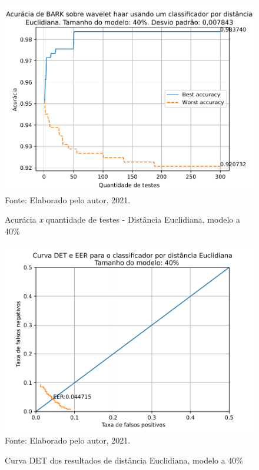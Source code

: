 			\begin{figure}[H]
				\centering
				\caption{Acurácia \textit{x} quantidade de testes - Distância Euclidiana, modelo a 40\%}
				\includegraphics[width=.9\linewidth]{images/results/confusionMatrices/classifier_Euclidian_40}
				\label{fig:classifiereuclidian40}
				\\Fonte: Elaborado pelo autor, 2021.
			\end{figure}
		
			\begin{figure}[H]
				\centering
				\caption{Curva DET dos resultados de distância Euclidiana, modelo a 40\%}
				\includegraphics[width=.9\linewidth]{images/results/det/DET_for_classifier_Euclidian_40}
				\label{fig:detforclassifiereuclidian40}
				\\Fonte: Elaborado pelo autor, 2021.
			\end{figure}
		
